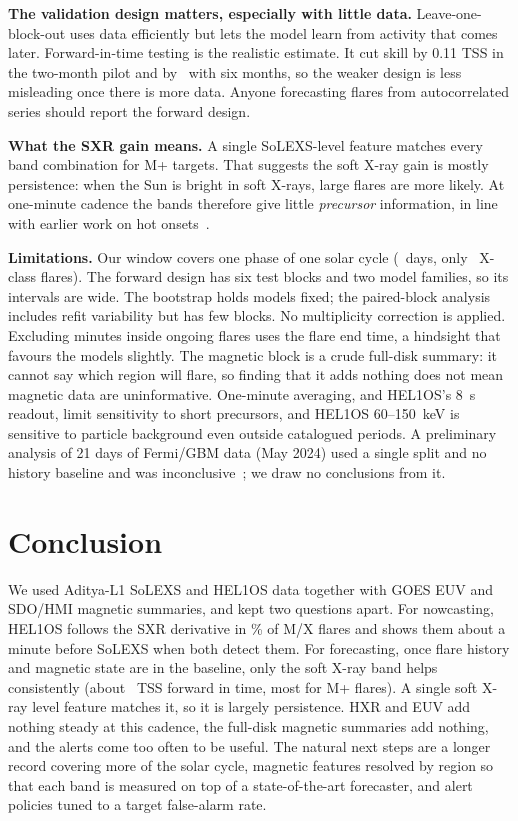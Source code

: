 \documentclass[conference]{IEEEtran}
\begin{document}
\textbf{The validation design matters, especially with little data.} Leave-one-block-out uses data efficiently but lets the model learn from activity that comes later. Forward-in-time testing is the realistic estimate. It cut skill by 0.11 TSS in the two-month pilot and by \FwdDiffMean\ with six months, so the weaker design is less misleading once there is more data. Anyone forecasting flares from autocorrelated series should report the forward design.

\textbf{What the SXR gain means.} A single SoLEXS-level feature matches every band combination for M+ targets. That suggests the soft X-ray gain is mostly persistence: when the Sun is bright in soft X-rays, large flares are more likely. At one-minute cadence the bands therefore give little \emph{precursor} information, in line with earlier work on hot onsets~\cite{hudson2021}.

\textbf{Limitations.} Our window covers one phase of one solar cycle (\NumDays\ days, only \NumFlaresX\ X-class flares). The forward design has six test blocks and two model families, so its intervals are wide. The bootstrap holds models fixed; the paired-block analysis includes refit variability but has few blocks. No multiplicity correction is applied. Excluding minutes inside ongoing flares uses the flare end time, a hindsight that favours the models slightly. The magnetic block is a crude full-disk summary: it cannot say which region will flare, so finding that it adds nothing does not mean magnetic data are uninformative. One-minute averaging, and HEL1OS's 8~s readout, limit sensitivity to short precursors, and HEL1OS 60--150~keV is sensitive to particle background even outside catalogued periods. A preliminary analysis of 21 days of Fermi/GBM data (May 2024) used a single split and no history baseline and was inconclusive~\cite{techreport}; we draw no conclusions from it.

\section{Conclusion}
We used Aditya-L1 SoLEXS and HEL1OS data together with GOES EUV and SDO/HMI magnetic summaries, and kept two questions apart. For nowcasting, HEL1OS follows the SXR derivative in \NeuPos\% of M/X flares and shows them about a minute before SoLEXS when both detect them. For forecasting, once flare history and magnetic state are in the baseline, only the soft X-ray band helps consistently (about \FwdGainSXR\ TSS forward in time, most for M+ flares). A single soft X-ray level feature matches it, so it is largely persistence. HXR and EUV add nothing steady at this cadence, the full-disk magnetic summaries add nothing, and the alerts come too often to be useful. The natural next steps are a longer record covering more of the solar cycle, magnetic features resolved by region so that each band is measured on top of a state-of-the-art forecaster, and alert policies tuned to a target false-alarm rate.
\end{document}
